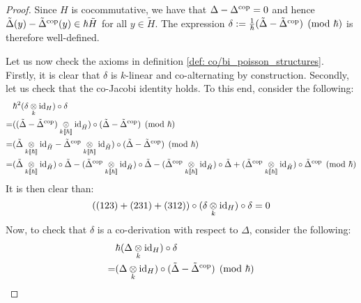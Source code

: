                 \begin{proof}
                    Since $H$ is cocommutative, we have that $\Delta - \Delta^{\mathrm{cop}} = 0$ and hence $\tilde{\Delta}(y) - \tilde{\Delta}^{\mathrm{cop}}(y) \in \hbar \tilde{H}$ for all $y \in \tilde{H}$. The expression $\delta := \frac{1}{\hbar}(\tilde{\Delta} - \tilde{\Delta}^{\mathrm{cop}}) \pmod{\hbar}$ is therefore well-defined.
    
                    Let us now check the axioms in definition \ref{def: co/bi_poisson_structures}. Firstly, it is clear that $\delta$ is $k$-linear and co-alternating by construction. Secondly, let us check that the co-Jacobi identity holds. To this end, consider the following:
                        $$
                            \begin{aligned}
                                & \hbar^2 (\delta \tensor_k \id_H) \circ \delta
                                \\
                                = & ( (\tilde{\Delta} - \tilde{\Delta}^{\cop}) \tensor_{k[\![\hbar]\!]} \id_{\tilde{H}} ) \circ (\tilde{\Delta} - \tilde{\Delta}^{\cop}) \pmod{\hbar}
                                \\
                                = & ( \tilde{\Delta} \tensor_{k[\![\hbar]\!]} \id_{\tilde{H}} - \tilde{\Delta}^{\cop} \tensor_{k[\![\hbar]\!]} \id_{\tilde{H}} ) \circ (\tilde{\Delta} - \tilde{\Delta}^{\cop}) \pmod{\hbar}
                                \\
                                = & (\tilde{\Delta} \tensor_{k[\![\hbar]\!]} \id_{\tilde{H}}) \circ \tilde{\Delta} - (\tilde{\Delta}^{\cop} \tensor_{k[\![\hbar]\!]} \id_{\tilde{H}}) \circ \tilde{\Delta} - (\tilde{\Delta}^{\cop} \tensor_{k[\![\hbar]\!]} \id_{\tilde{H}}) \circ \tilde{\Delta} + (\tilde{\Delta}^{\cop} \tensor_{k[\![\hbar]\!]} \id_{\tilde{H}}) \circ \tilde{\Delta}^{\cop} \pmod{\hbar}
                            \end{aligned}
                        $$
                    It is then clear than:
                        $$((123) + (231) + (312)) \circ (\delta \tensor_k \id_H) \circ \delta = 0$$
                    Now, to check that $\delta$ is a co-derivation with respect to $\Delta$, consider the following:
                        $$
                            \begin{aligned}
                                & \hbar (\Delta \tensor_k \id_H) \circ \delta 
                                \\
                                = & (\Delta \tensor_k \id_H) \circ (\tilde{\Delta} - \tilde{\Delta}^{\cop}) \pmod{\hbar} 

\end{aligned}$$
\end{proof}
